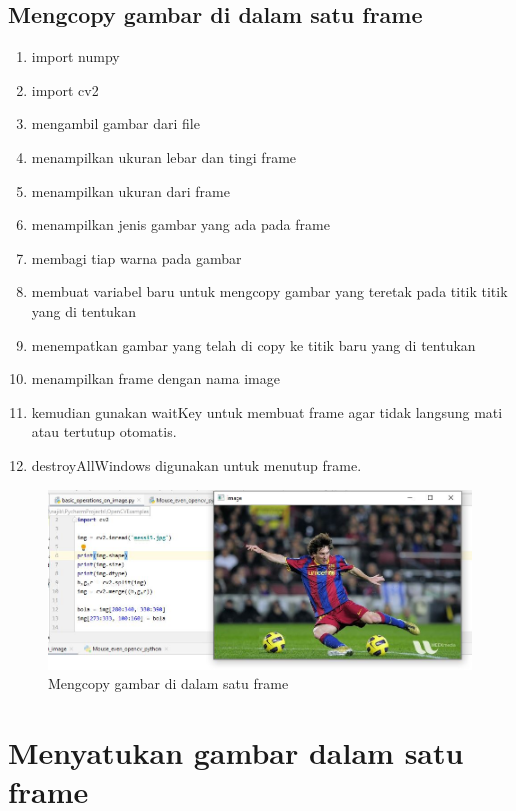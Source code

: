 \subsection{Mengcopy gambar di dalam satu frame}

\begin{enumerate}
	\item import numpy
	\item import cv2
	\item mengambil gambar dari file 
	\item menampilkan ukuran lebar dan tingi frame
	\item menampilkan ukuran dari frame
	\item menampilkan jenis gambar yang ada pada frame
	\item membagi tiap warna pada gambar
	\item membuat variabel baru untuk mengcopy gambar yang teretak pada titik titik yang di tentukan
	\item menempatkan gambar yang telah di copy ke titik baru yang di tentukan
	\item menampilkan frame dengan nama image 
	\item kemudian gunakan waitKey untuk membuat frame agar tidak langsung mati atau tertutup otomatis.
	\item destroyAllWindows digunakan untuk menutup frame.
\end{enumerate}

\newpage
\begin{figure}[ht]
\centering
\includegraphics[scale=0.5]{figures/2,27.jpg}
\caption{Mengcopy gambar di dalam satu frame}
\label{contoh}
\end{figure}



\newpage
\section{Menyatukan gambar dalam satu frame}
